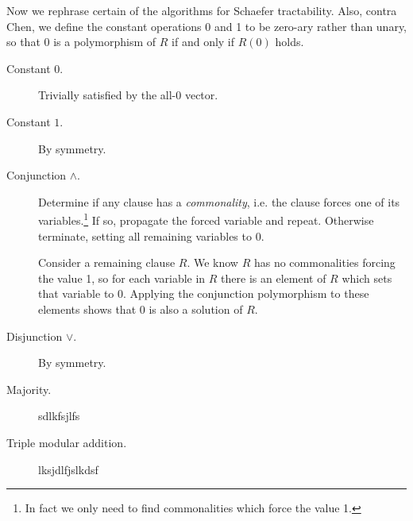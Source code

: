 \documentclass{article}
\begin{document}
\bigskip

Now we rephrase certain of the algorithms for Schaefer tractability.
Also, contra Chen, we define the constant operations 0 and 1 to be zero-ary rather than unary, so that 0 is a polymorphism of $R$ if and only if $R(0)$ holds.

\begin{description}
  \item[Constant $0$.] Trivially satisfied by the all-0 vector.
  \item[Constant $1$.] By symmetry.
  \item[Conjunction $\land$.] Determine if any clause has a \textit{commonality}, i.e. the clause forces one of its variables.\footnote{In fact we only need to find commonalities which force the value 1.}  If so, propagate the forced variable and repeat.  Otherwise terminate, setting all remaining variables to 0.

    Consider a remaining clause $R$.  We know $R$ has no commonalities forcing the value 1, so for each variable in $R$ there is an element of $R$ which sets that variable to 0.  Applying the conjunction polymorphism to these elements shows that 0 is also a solution of $R$.
  \item[Disjunction $\lor$.] By symmetry.
  \item[Majority.] sdlkfsjlfs
  \item[Triple modular addition.] lksjdlfjslkdsf
\end{description}
\end{document}
